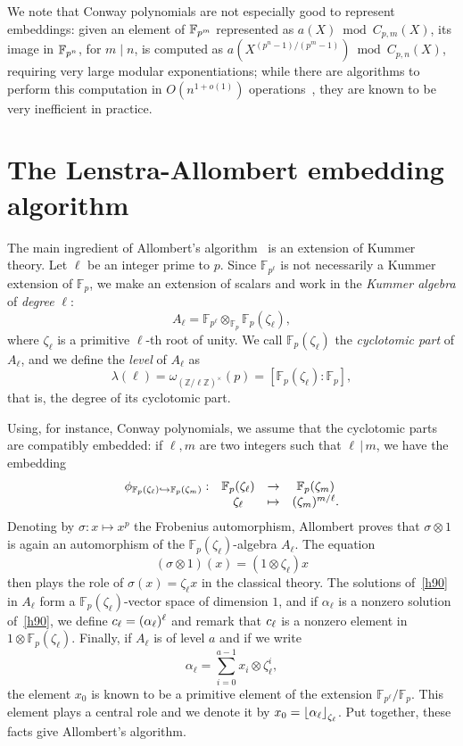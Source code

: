 \documentclass{sig-alternate}
\begin{document}
We note that Conway polynomials are not especially good to represent
embeddings: given an element of $\mathbb{F}_{p^m}$ represented as
$a(X) \bmod C_{p,m}(X)$, its image in $\mathbb{F}_{p^n}$, for $m\mid n$, is
computed as $a(X^{(p^n-1)/(p^m-1)})\bmod C_{p,n}(X)$, requiring very
large modular exponentiations; while there are algorithms to perform
this computation in $O(n^{1+o(1)})$ operations~\cite{KeUm11}, they are
known to be very inefficient in practice. %


\section{The Lenstra-Allombert embedding algorithm}
\label{sec:lenstra}
\cite{LenstraJr91}\cite{brieulle2018computing}


The main ingredient of Allombert's algorithm~\cite{Allombert02} is an extension
of Kummer theory.
Let $\ell$ be an integer prime to $p$.
Since $\mathbb{F}_{p^\ell}$ is not necessarily a Kummer
extension of $\mathbb{F}_p$, we make an extension of scalars and work in the
\emph{Kummer algebra} of \emph{degree} $\ell$:
\[
  A_\ell = \mathbb{F}_{p^\ell}\otimes_{\mathbb{F}_{p}}\mathbb{F}_{p}(\zeta_\ell),
\]
where $\zeta_\ell$ is a primitive $\ell$-th root of unity. We
call $\mathbb{F}_{p}(\zeta_\ell)$ the \emph{cyclotomic part} of $A_\ell$, and
we define the \emph{level} of $A_\ell$ as
\[
  \lambda(\ell) = \omega_{(\mathbb{Z}/\ell\mathbb{Z})^\times}(p) = [\mathbb{F}_{p}(\zeta_\ell):\mathbb{F}_{p}],
\]
that is, the degree of its cyclotomic part.

Using, for instance,
Conway polynomials, we assume that the cyclotomic parts are compatibly embedded: if
$\ell, m$ are two integers such that $\ell\,|\,m$, we have the embedding
\[
\begin{array}{cccc}
  \phi_{\mathbb{F}_{p}(\zeta_{\ell})\hookrightarrow\mathbb{F}_{p}(\zeta_{m})}: & \mathbb{F}_{p}(\zeta_\ell) & \to & \mathbb{F}_{p}(\zeta_m) \\
  & \zeta_\ell & \mapsto & (\zeta_{m})^{m/\ell}.
\end{array}
\]
Denoting by $\sigma:x\mapsto x^p$ the Frobenius automorphism, Allombert proves that
$\sigma\otimes1$ is again an automorphism of the
$\mathbb{F}_{p}(\zeta_\ell)$-algebra $A_\ell$. The equation
\begin{equation}
  \tag{H90}
 (\sigma\otimes1)(x) = (1\otimes\zeta_\ell)x
  \label{h90}
\end{equation}
then plays the role of $\sigma(x)=\zeta_\ell x$ in the classical theory. The
solutions of~\eqref{h90} in $A_\ell$ form a
$\mathbb{F}_{p}(\zeta_{\ell})$-vector space of dimension $1$, and if $\alpha_\ell$ is a
nonzero solution
of~\eqref{h90}, we define $c_\ell = (\alpha_\ell)^\ell$ and remark that
$c_\ell$ is a nonzero element in $1\otimes\mathbb{F}_{p}(\zeta_\ell)$. Finally,
if $A_\ell$ is of level $a$ and if we write
\[
  \alpha_\ell = \sum_{i =  0}^{a-1}x_i\otimes\zeta_{\ell}^i,
\]
the element $x_0$ is known to be a primitive element of the extension
$\mathbb{F}_{p^\ell}/\mathbb{F}_{p}$. This element plays a central role and we
denote it by $x_0 = \left\lfloor \alpha_\ell \right\rfloor_{\zeta_\ell}$. Put together, these facts give Allombert's
algorithm.
\end{document}
